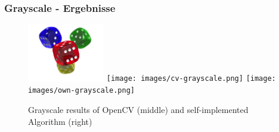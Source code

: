 \begin{frame}
    \frametitle{Grayscale - Ergebnisse}

    \begin{figure}[H]
        \centering
    
        \includegraphics[width=0.30\textwidth]{images/dice.png}
        \texttt{[image: images/cv-grayscale.png]}
        \texttt{[image: images/own-grayscale.png]}
        
        \begin{center}
            \caption{Grayscale results of OpenCV (middle) and self-implemented  Algorithm (right)}            
        \end{center}

        \label{fig:grayscale}
    \end{figure}
\end{frame}


